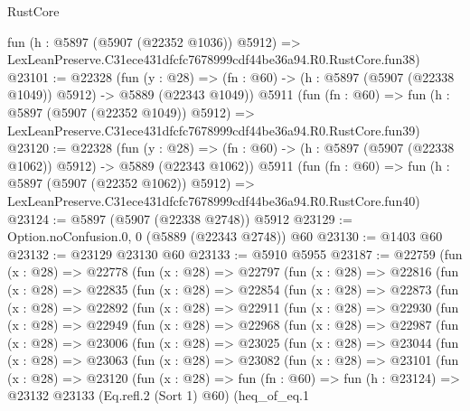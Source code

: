 \begin{lexlean}{RustCore}
\begin{coremodule}
    fun (h : @5897 (@5907 (@22352 @1036)) @5912) =>
    LexLeanPreserve.C31ece431dfcfc7678999cdf44be36a94.R0.RustCore.fun38)
@23101 := @22328
    (fun (y : @28) =>
    (fn : @60) -> (h : @5897 (@5907 (@22338 @1049)) @5912) -> @5889 (@22343 @1049))
    @5911
    (fun (fn : @60) =>
    fun (h : @5897 (@5907 (@22352 @1049)) @5912) =>
    LexLeanPreserve.C31ece431dfcfc7678999cdf44be36a94.R0.RustCore.fun39)
@23120 := @22328
    (fun (y : @28) =>
    (fn : @60) -> (h : @5897 (@5907 (@22338 @1062)) @5912) -> @5889 (@22343 @1062))
    @5911
    (fun (fn : @60) =>
    fun (h : @5897 (@5907 (@22352 @1062)) @5912) =>
    LexLeanPreserve.C31ece431dfcfc7678999cdf44be36a94.R0.RustCore.fun40)
@23124 := @5897 (@5907 (@22338 @2748)) @5912
@23129 := Option.noConfusion.{0, 0} (@5889 (@22343 @2748)) @60
@23130 := @1403 @60
@23132 := @23129 @23130 @60
@23133 := @5910 @5955
@23187 := @22759
    (fun (x : @28) =>
    @22778
      (fun (x : @28) =>
      @22797
        (fun (x : @28) =>
        @22816
          (fun (x : @28) =>
          @22835
            (fun (x : @28) =>
            @22854
              (fun (x : @28) =>
              @22873
                (fun (x : @28) =>
                @22892
                  (fun (x : @28) =>
                  @22911
                    (fun (x : @28) =>
                    @22930
                      (fun (x : @28) =>
                      @22949
                        (fun (x : @28) =>
                        @22968
                          (fun (x : @28) =>
                          @22987
                            (fun (x : @28) =>
                            @23006
                              (fun (x : @28) =>
                              @23025
                                (fun (x : @28) =>
                                @23044
                                  (fun (x : @28) =>
                                  @23063
                                    (fun (x : @28) =>
                                    @23082
                                      (fun (x : @28) =>
                                      @23101
                                        (fun (x : @28) =>
                                        @23120
                                          (fun (x : @28) =>
                                          fun (fn : @60) =>
                                          fun (h : @23124) =>
                                          @23132
                                            @23133
                                            (Eq.refl.{2} (Sort 1) @60)
                                            (heq_of_eq.{1}

\end{coremodule}
\end{lexlean}
